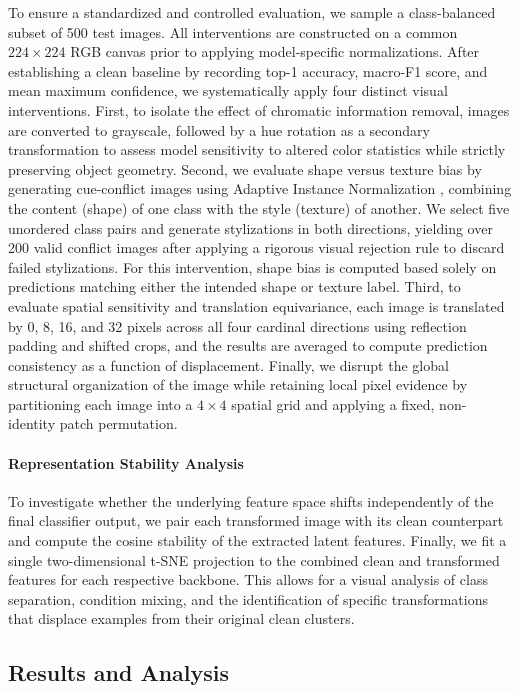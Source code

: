 \documentclass{article}
\begin{document}
To ensure a standardized and controlled evaluation, we sample a class-balanced subset of 500 test images. All interventions are constructed on a common $224 \times 224$ RGB canvas prior to applying model-specific normalizations. After establishing a clean baseline by recording top-1 accuracy, macro-F1 score, and mean maximum confidence, we systematically apply four distinct visual interventions. First, to isolate the effect of chromatic information removal, images are converted to grayscale, followed by a hue rotation as a secondary transformation to assess model sensitivity to altered color statistics while strictly preserving object geometry. Second, we evaluate shape versus texture bias by generating cue-conflict images using Adaptive Instance Normalization \citep{Huang_2017_ICCV}, combining the content (shape) of one class with the style (texture) of another. We select five unordered class pairs and generate stylizations in both directions, yielding over 200 valid conflict images after applying a rigorous visual rejection rule to discard failed stylizations. For this intervention, shape bias is computed based solely on predictions matching either the intended shape or texture label. Third, to evaluate spatial sensitivity and translation equivariance, each image is translated by 0, 8, 16, and 32 pixels across all four cardinal directions using reflection padding and shifted crops, and the results are averaged to compute prediction consistency as a function of displacement. Finally, we disrupt the global structural organization of the image while retaining local pixel evidence by partitioning each image into a $4 \times 4$ spatial grid and applying a fixed, non-identity patch permutation.

\paragraph{Representation Stability Analysis}

To investigate whether the underlying feature space shifts independently of the final classifier output, we pair each transformed image with its clean counterpart and compute the cosine stability of the extracted latent features. Finally, we fit a single two-dimensional t-SNE projection to the combined clean and transformed features for each respective backbone. This allows for a visual analysis of class separation, condition mixing, and the identification of specific transformations that displace examples from their original clean clusters.

\subsection{Results and Analysis}
\end{document}
